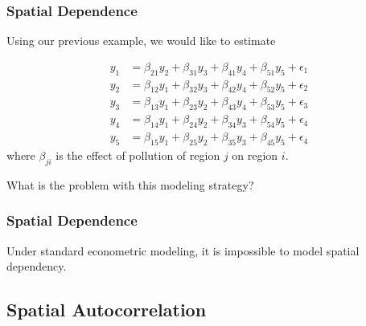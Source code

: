 \documentclass[english,10pt]{beamer}\usepackage[]{graphicx}\usepackage[]{xcolor}
\begin{document}
\begin{frame}
  \frametitle{Spatial Dependence}
    Using our previous example, we would like to estimate 

\begin{equation}
  \begin{aligned}
y_1 & = \beta_{21} y_2 + \beta_{31} y_3 + \beta_{41} y_4 + \beta_{51} y_5 + \epsilon_1 \\
y_2 & = \beta_{12} y_1 + \beta_{32} y_3 + \beta_{42} y_4 + \beta_{52} y_5 + \epsilon_2 \\
y_3 & = \beta_{13} y_1 + \beta_{23} y_2 + \beta_{43} y_4 + \beta_{53} y_5 + \epsilon_3 \\
y_4 & = \beta_{14} y_1 + \beta_{24} y_2 + \beta_{34} y_3 + \beta_{54} y_5 + \epsilon_4 \\
y_5 & = \beta_{15} y_1 + \beta_{25} y_2 + \beta_{35} y_3 + \beta_{45} y_5 + \epsilon_4 
\end{aligned}
\end{equation}
%
where $\beta_{ji}$ is the effect of pollution of region $j$ on region $i$.
    
    \pause 
    \begin{alertblock}{}
    What is the problem with this modeling strategy?
    \end{alertblock}
\end{frame}


\begin{frame}
  \frametitle{Spatial Dependence}
  \begin{alertblock}{}
    Under standard econometric modeling, it is impossible to model spatial dependency.
  \end{alertblock}
\end{frame}

\subsection{Spatial Autocorrelation}
\end{document}
